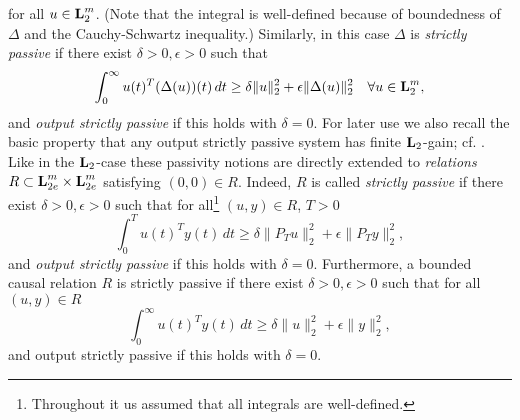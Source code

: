 \documentclass[11pt]{article}
\makeatletter
\def\@qedsymbol{${}_\blacksquare$}
\def\qed{\@endgadget{\@qedsymbol}}
\newtheorem{pf}[lemma]{Proof}
\newcommand{\Ltwo}{\boldsymbol{\rm L}_{2}}
\newcommand{\Ltwoe}{\boldsymbol{\rm L}_{2e}}
\makeatother
\begin{document}
for all $u \in \Ltwo^m$. (Note that the integral is well-defined because of boundedness of $\Delta$ and the Cauchy-Schwartz inequality.)
Similarly, in this case $\Delta$ is {\it strictly passive} if there exist $\delta>0, \epsilon > 0$ such that
\begin{equation}\label{eq: causal_passive1}
\int_0^\infty u(t)^T (\Delta (u))(t) \, dt \geq \delta \|u\|_2^2 + \epsilon \|\Delta (u)\|_2^2 \quad \forall u \in \Ltwo^m,
\end{equation}
and {\it output strictly passive} if this holds with $\delta=0$.
For later use we also recall the basic property that any output strictly passive system has finite $\Ltwo$-gain; cf. \cite[Theorem 2.2.13]{Sch17}.
Like in the $\Ltwo$-case these passivity notions are directly extended to {\it relations} $R \subset \Ltwoe^m \times \Ltwoe^m$ satisfying
$(0,0) \in R$. Indeed, $R$ is called {\it strictly passive} if there exist $\delta>0, \epsilon > 0$ such that for all\footnote{Throughout it us assumed that all integrals are well-defined.} $(u,y) \in R$, $T > 0$
\begin{equation}
\int_0^T u(t)^T y(t) \, dt \geq \delta \|P_T u\|_2^2 +  \epsilon \|P_T y\|_2^2,
\end{equation}
and {\it output strictly passive} if this holds with $\delta=0$. Furthermore, a bounded causal relation $R$ is strictly passive if there exist
$\delta>0, \epsilon > 0$ such that for all $(u,y) \in R$
\begin{equation}
\int_0^{\infty} u(t)^T y(t) \, dt \geq \delta \|u\|_2^2 +  \epsilon \|y\|_2^2,
\end{equation}
and output strictly passive if this holds with $\delta=0$. 
%
\end{document}
